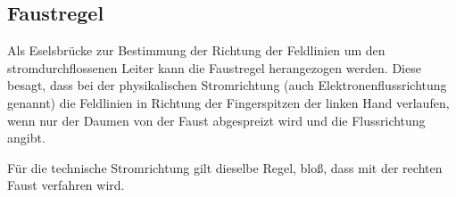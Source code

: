 




%
%	





\subsection{Faustregel}	\label{subsec:Faustregel}

Als Eselsbrücke zur Bestimmung der Richtung der Feldlinien um den stromdurchflossenen Leiter kann die \glqq Faustregel\grqq{} herangezogen werden. Diese besagt, dass bei der physikalischen Stromrichtung (auch Elektronenflussrichtung genannt) die Feldlinien in Richtung der Fingerspitzen der linken Hand verlaufen, wenn nur der Daumen von der Faust abgespreizt wird und die Flussrichtung angibt.

Für die technische Stromrichtung gilt dieselbe Regel, bloß, dass mit der rechten Faust verfahren wird.

